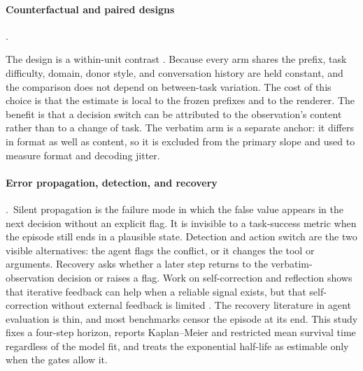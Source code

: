 \documentclass[a4paper,fleqn]{cas-sc}
\begin{document}
\paragraph{Counterfactual and paired designs}.\

The design is a within-unit contrast \cite{causal,rubin1974}. Because every arm shares the prefix,
task difficulty, domain, donor style, and conversation history are held constant, and the
comparison does not depend on between-task variation. The cost of this choice is that the
estimate is local to the frozen prefixes and to the renderer. The benefit is that a decision
switch can be attributed to the observation's content rather than to a change of task. The
verbatim arm is a separate anchor: it differs in format as well as content, so it is excluded
from the primary slope and used to measure format and decoding jitter.

\paragraph{Error propagation, detection, and recovery}.\
Silent propagation is the failure mode in which the false value appears in the next decision
without an explicit flag. It is invisible to a task-success metric when the episode still ends
in a plausible state. Detection and action switch are the two visible alternatives: the agent
flags the conflict, or it changes the tool or arguments. Recovery asks whether a later step
returns to the verbatim-observation decision or raises a flag. Work on self-correction and
reflection shows that iterative feedback can help when a reliable signal exists, but that
self-correction without external feedback is limited
\cite{selfrefine,reflexion,critic,selfcorrect_limit}. The recovery literature in agent
evaluation is thin, and most benchmarks censor the episode at its end. This study fixes a
four-step horizon, reports Kaplan--Meier and restricted mean survival time regardless of the
model fit, and treats the exponential half-life as estimable only when the gates allow it.
\end{document}
